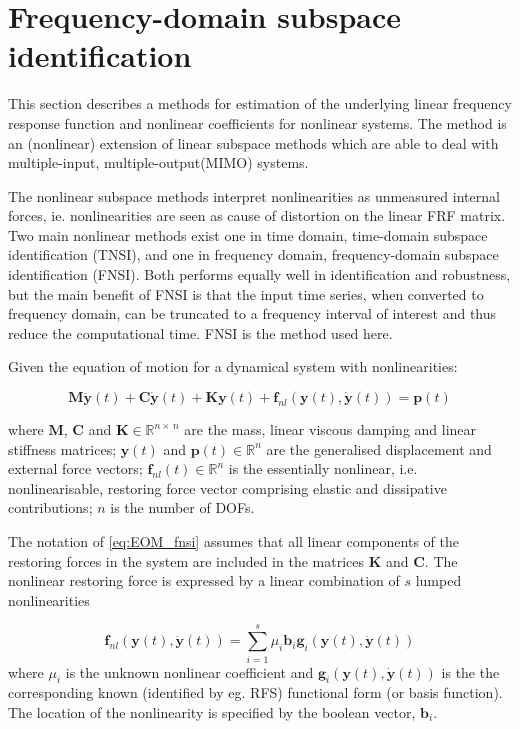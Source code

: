\section{Frequency-domain subspace identification}
\label{sec:freq-doma-subsp}

This section describes a methods for estimation of the underlying linear
frequency response function and nonlinear coefficients for nonlinear systems.
The method is an (nonlinear) extension of linear subspace methods which are able
to deal with multiple-input, multiple-output(MIMO) systems.

The nonlinear subspace methods interpret nonlinearities as unmeasured internal
forces, ie. nonlinearities are seen as cause of distortion on the linear FRF
matrix. Two main nonlinear methods exist one in time domain, time-domain
subspace identification (TNSI)\autocite{marchesiello2008a}, and one in frequency
domain, frequency-domain subspace identification (FNSI)\autocite{noel2013a}.
Both performs equally well in identification and robustness, but the main
benefit of FNSI is that the input time series, when converted to frequency
domain, can be truncated to a frequency interval of interest and thus reduce the
computational time. FNSI is the method used here.


Given the equation of motion for a dynamical system with nonlinearities:

\begin{equation}
  \label{eq:EOM_fnsi}
  \bm M \ddot{\bm y}(t) + \bm C \dot{\bm y}(t) + \bm K \bm y(t) +
  \bm f_{nl} \left( \bm y(t), \dot{ \bm y}(t) \right) = \bm p (t)
\end{equation}

where $\bm M$, $\bm C$ and $\bm K \in \mathbb{R}^{n \times \, n}$ are the
mass, linear viscous damping and linear stiffness matrices; $\bm y(t)$ and
$\bm p(t) \in \mathbb{R}^{n}$ are the generalised displacement and external
force vectors; $\bm f_{nl}(t) \in \mathbb{R}^{n}$ is the essentially nonlinear,
i.e. nonlinearisable, restoring force vector comprising elastic and dissipative
contributions; $n$ is the number of DOFs.


The notation of \eqref{eq:EOM_fnsi} assumes that all linear components of the
restoring forces in the system are included in the matrices $\bm K$ and $\bm
C$. The nonlinear restoring force is expressed by a linear combination of $s$
lumped nonlinearities

\begin{equation}
  \label{eq:nonlin_fnsi_lummped}
  \bm f_{nl} \left( \bm y(t), \dot{\bm y}(t) \right) =
  \sum_{i=1}^s \mu_i \bm b_i \bm g_i \left( \bm y(t), \dot{\bm y}(t) \right)
\end{equation}
where $\mu_i$ is the unknown nonlinear coefficient and $\bm g_i \left( \bm y(t),
  \dot{\bm y}(t) \right)$ is the the corresponding known (identified by eg. RFS)
functional form (or basis function). The location of the nonlinearity is
specified by the boolean vector, $\bm b_i$.


